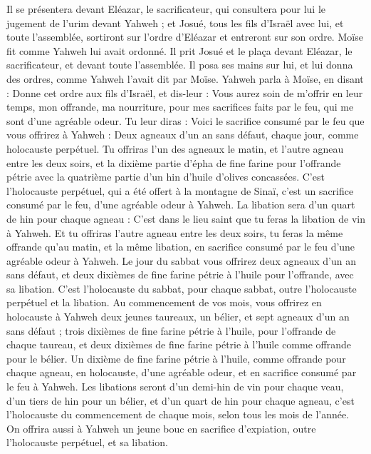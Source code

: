 \begin{multicols}{2}
Il se présentera devant Eléazar, le sacrificateur, qui consultera pour lui le jugement de l'urim devant Yahweh ; et Josué, tous les fils d’Israël avec lui, et toute l’assemblée, sortiront sur l’ordre d’Eléazar et entreront sur son ordre.
Moïse fit comme Yahweh lui avait ordonné. Il prit Josué et le plaça devant Eléazar, le sacrificateur, et devant toute l'assemblée.
Il posa ses mains sur lui, et lui donna des ordres, comme Yahweh l'avait dit par Moïse.
\VerseOne{}Yahweh parla à Moïse, en disant :
Donne cet ordre aux fils d'Israël, et dis-leur : Vous aurez soin de m'offrir en leur temps, mon offrande, ma nourriture, pour mes sacrifices faits par le feu, qui me sont d'une agréable odeur.
Tu leur diras : Voici le sacrifice consumé par le feu que vous offrirez à Yahweh : Deux agneaux d'un an sans défaut, chaque jour, comme holocauste perpétuel.
Tu offriras l'un des agneaux le matin, et l'autre agneau entre les deux soirs,
et la dixième partie d'épha de fine farine pour l’offrande pétrie avec la quatrième partie d'un hin d'huile d’olives concassées.
C'est l'holocauste perpétuel, qui a été offert à la montagne de Sinaï, c’est un sacrifice consumé par le feu, d’une agréable odeur à Yahweh.
La libation sera d'un quart de hin pour chaque agneau : C'est dans le lieu saint que tu feras la libation de vin à Yahweh.
Et tu offriras l'autre agneau entre les deux soirs, tu feras la même offrande qu'au matin, et la même libation, en sacrifice consumé par le feu d’une agréable odeur à Yahweh.
Le jour du sabbat vous offrirez deux agneaux d'un an sans défaut, et deux dixièmes de fine farine pétrie à l'huile pour l’offrande, avec sa libation.
C'est l'holocauste du sabbat, pour chaque sabbat, outre l'holocauste perpétuel et la libation.
Au commencement de vos mois, vous offrirez en holocauste à Yahweh deux jeunes taureaux, un bélier, et sept agneaux d'un an sans défaut ;
trois dixièmes de fine farine pétrie à l'huile, pour l’offrande de chaque taureau, et deux dixièmes de fine farine pétrie à l'huile comme offrande pour le bélier.
Un dixième de fine farine pétrie à l'huile, comme offrande pour chaque agneau, en holocauste, d’une agréable odeur, et en sacrifice consumé par le feu à Yahweh.
Les libations seront d'un demi-hin de vin pour chaque veau, d’un tiers de hin pour un bélier, et d’un quart de hin pour chaque agneau, c'est l'holocauste du commencement de chaque mois, selon tous les mois de l'année.
On offrira aussi à Yahweh un jeune bouc en sacrifice d’expiation, outre l'holocauste perpétuel, et sa libation.

\end{multicols}
